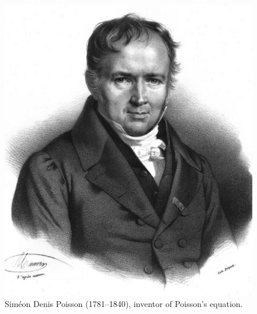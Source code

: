 \begin{figure}
  \begin{center}
    \includegraphics[width=\smallwidth]{chapters/kirby-7/eps/Simeon_Poisson.eps}
    \caption{Sim\'eon Denis Poisson (1781--1840), inventor of
      Poisson's equation.}
    \label{fig:poisson}
  \end{center}
\end{figure}


